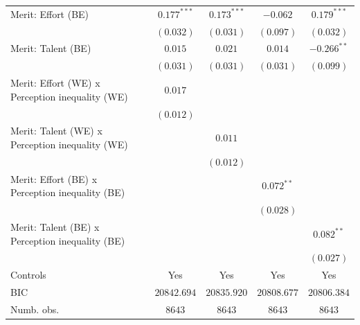 \documentclass[
  12pt,
]{article}
\begin{document}
\begin{table}
{\begin{center}
{\begin{tabular}{l c c c c}
Merit: Effort (BE)                                            & $0.177^{***}$  & $0.173^{***}$  & $-0.062$       & $0.179^{***}$  \\
                                                              & $(0.032)$      & $(0.031)$      & $(0.097)$      & $(0.032)$      \\
Merit: Talent (BE)                                            & $0.015$        & $0.021$        & $0.014$        & $-0.266^{**}$  \\
                                                              & $(0.031)$      & $(0.031)$      & $(0.031)$      & $(0.099)$      \\
Merit: Effort (WE) x Perception inequality (WE)               & $0.017$        &                &                &                \\
                                                              & $(0.012)$      &                &                &                \\
Merit: Talent (WE) x Perception inequality (WE)               &                & $0.011$        &                &                \\
                                                              &                & $(0.012)$      &                &                \\
Merit: Effort (BE) x Perception inequality (BE)               &                &                & $0.072^{**}$   &                \\
                                                              &                &                & $(0.028)$      &                \\
Merit: Talent (BE) x Perception inequality (BE)               &                &                &                & $0.082^{**}$   \\
                                                              &                &                &                & $(0.027)$      \\
\hline
Controls                                                      & Yes            & Yes            & Yes            & Yes            \\
BIC                                                           & $20842.694$    & $20835.920$    & $20808.677$    & $20806.384$    \\
Numb. obs.                                                    & $8643$         & $8643$         & $8643$         & $8643$         \\

\end{tabular}}
\end{center}}
\end{table}
\end{document}
